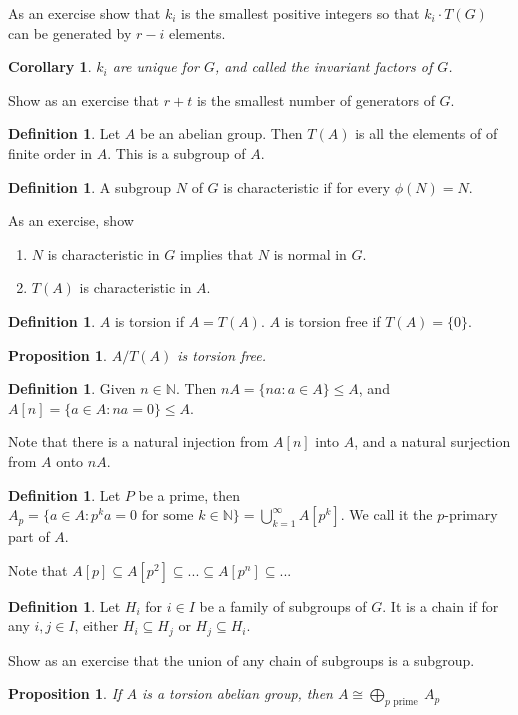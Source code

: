 \documentclass{amsart}
\newtheorem{prop}[thm]{Proposition}
\newtheorem{cor}[thm]{Corollary}
\theoremstyle{definition}
\newtheorem{definition}[thm]{Definition}
\newcommand{\N}{\mathbb N}
\begin{document}
As an exercise show that $k_i$ is the smallest positive integers so that $k_i\cdot T(G)$ can be generated by $r-i$ elements.

\begin{cor}
$k_i$ are unique for $G$, and called the invariant factors of $G$.	
\end{cor}
Show as an exercise that $r+t$ is the smallest number of generators of $G$.
\begin{definition}
Let $A$ be an abelian group. Then $T(A)$ is all the elements of of finite order in $A$. This is a subgroup of $A$.
\end{definition}
\begin{definition}
A subgroup $N$ of $G$ is characteristic if for every $\phi(N)=N$. 	
\end{definition}
As an exercise, show \begin{enumerate}
 \item $N$ is characteristic in $G$ implies that $N$ is normal in $G$.
 \item $T(A)$ is characteristic in $A$.	
 \end{enumerate}
\begin{definition}
$A$ is torsion if $A=T(A)$. $A$ is torsion free if $T(A)=\{0\}$.	
\end{definition}
\begin{prop}
$A/T(A)$ is torsion free.	
\end{prop}
\begin{definition}
Given $n\in\N$. Then $nA=\{na:a\in A\}\leq A$, and $A[n]=\{a\in A: na=0\}\leq A$.	
\end{definition}
Note that there is a natural injection from $A[n]$ into $A$, and a natural surjection from $A$ onto $nA$.
\begin{definition}
Let $P$ be a prime, then $A_p=\{a\in A:p^ka=0\text{ for some }k\in\N\}=\bigcup\limits_{k=	1}^\infty A[p^k]$. We call it the $p$-primary part of $A$.	
\end{definition}
Note that $A[p]\subseteq A[p^2]\subseteq...\subseteq A[p^n]\subseteq ...$
\begin{definition}
Let $H_i$ for $i\in I$ be a family of subgroups of $G$. It is a chain if for any $i,j\in I$, either $H_i\subseteq H_j$ or $H_j\subseteq H_i$.	
\end{definition}
Show as an exercise that the union of any chain of subgroups is a subgroup.
\begin{prop}
If $A$ is a torsion abelian group, then $A\cong \bigoplus\limits_{p\text{ prime }}A_p$
\end{prop}
\end{document}
